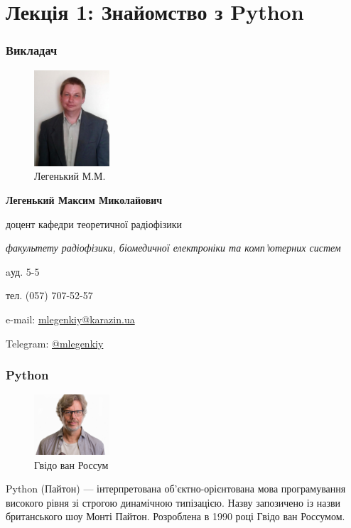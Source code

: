\section{Лекція 1: Знайомство з Python}
 
\begin{frame}
\frametitle{Викладач}
\begin{figure}
\includegraphics[width=0.25\textwidth]{pictures/myphoto}
\caption{Легенький М.М.}
\label{myphoto}
\end{figure}
\textbf{Легенький Максим Миколайович}

доцент кафедри теоретичної радіофізики

\textit{факультету радіофізики, біомедичної електроніки та комп’ютерних систем}

aуд. 5-5

тел. (057) 707-52-57

e-mail: \href{mailto:mlegenkiy@karazin.ua}{mlegenkiy@karazin.ua}

Telegram: \href{https://t.me/mlegenkiy}{@mlegenkiy}
\end{frame}

\begin{frame}
\frametitle{Python}
\begin{figure}
\includegraphics[width=0.25\textwidth]{pictures/guido}
\caption{Гвідо ван Россум}
\label{gvido}
\end{figure}
Python (Пайтон) — інтерпретована об'єктно-орієнтована мова програмування високого рівня зі строгою динамічною типізацією.  Назву запозичено із назви британського шоу Монті Пайтон. Розроблена в 1990 році Гвідо ван Россумом. 
\end{frame}

